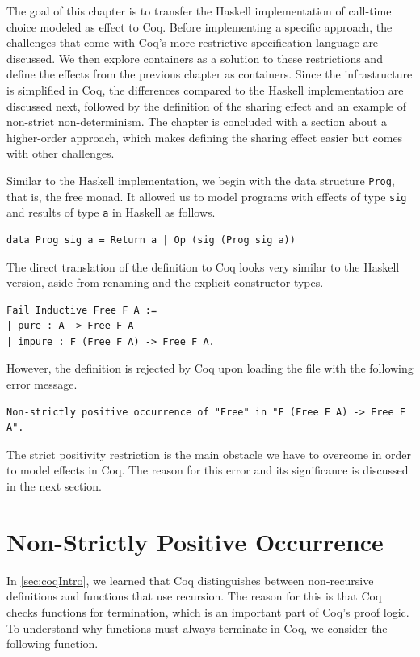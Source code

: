 \documentclass[a4paper, 11pt, fleqn, twoside, abstract=on]{scrreprt}
\newcommand{\hinl}[1]{\texttt{#1}}
\begin{document}
The goal of this chapter is to transfer the Haskell implementation of call-time choice modeled as effect to Coq.
Before implementing a specific approach, the challenges that come with Coq's more restrictive specification language are discussed.
We then explore containers as a solution to these restrictions and define the effects from the previous chapter as containers.
Since the infrastructure is simplified in Coq, the differences compared to the Haskell implementation are discussed next, followed by the definition of the sharing effect and an example of non-strict non-determinism.
The chapter is concluded with a section about a higher-order approach, which makes defining the sharing effect easier but comes with other challenges.

Similar to the Haskell implementation, we begin with the data structure \hinl{Prog}, that is, the free monad.
It allowed us to model programs with effects of type \hinl{sig} and results of type \hinl{a} in Haskell as follows.

\begin{verbatim}
data Prog sig a = Return a | Op (sig (Prog sig a))
\end{verbatim}

The direct translation of the definition to Coq looks very similar to the Haskell version, aside from renaming and the explicit constructor types.

\begin{verbatim}
Fail Inductive Free F A :=
| pure : A -> Free F A
| impure : F (Free F A) -> Free F A.
\end{verbatim}

However, the definition is rejected by Coq upon loading the file with the following error message.

\begin{verbatim}
Non-strictly positive occurrence of "Free" in "F (Free F A) -> Free F A".
\end{verbatim}

The strict positivity restriction is the main obstacle we have to overcome in order to model effects in Coq.
The reason for this error and its significance is discussed in the next section.

\section{Non-Strictly Positive Occurrence}
\label{sec:non-strictly}

In \autoref{sec:coqIntro}, we learned that Coq distinguishes between non-recursive definitions and functions that use recursion.
The reason for this is that Coq checks functions for termination, which is an important part of Coq's proof logic.
To understand why functions must always terminate in Coq, we consider the following function.
\end{document}
